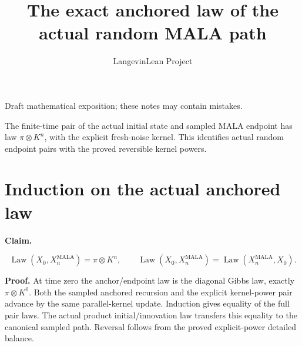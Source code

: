 \documentclass[11pt,a4paper]{article}
\title{\texorpdfstring{The exact anchored law of the actual random MALA path}{The exact anchored law of the actual random MALA path}}
\author{LangevinLean Project}
\date{}
\begin{document}
\maketitle
Draft mathematical exposition; these notes may contain mistakes.


The finite-time pair of the actual initial state and sampled MALA endpoint has law \(\pi\otimes K^n\), with the explicit fresh-noise kernel. This identifies actual random endpoint pairs with the proved reversible kernel powers.


\section{\texorpdfstring{Induction on the actual anchored law}{Induction on the actual anchored law}}


\textbf{Claim.}

\[\operatorname{Law}(X_0,X_n^{\mathrm{MALA}})=\pi\otimes K^n,\qquad \operatorname{Law}(X_0,X_n^{\mathrm{MALA}})=\operatorname{Law}(X_n^{\mathrm{MALA}},X_0).\]

\textbf{Proof.} At time zero the anchor/\allowbreak{}endpoint law is the diagonal Gibbs law, exactly \(\pi\otimes K^0\). Both the sampled anchored recursion and the explicit kernel-power pair advance by the same parallel-kernel update. Induction gives equality of the full pair laws. The actual product initial/\allowbreak{}innovation law transfers this equality to the canonical sampled path. Reversal follows from the proved explicit-power detailed balance.
\end{document}
